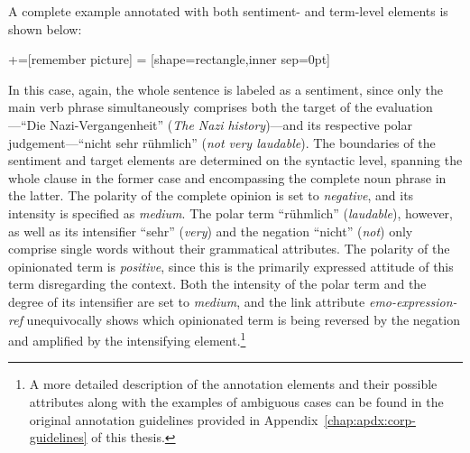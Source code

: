 A complete example annotated with both sentiment- and term-level
elements is shown below:
\begin{example}\label{snt:exmp:sent-anno2}
  +=[remember picture]
   = [shape=rectangle,inner sep=0pt]
  \upshape{}\\[2.2em]
  \noindent{}

\end{example}
In this case, again, the whole sentence is labeled as a sentiment,
since only the main verb phrase simultaneously comprises both the
target of the evaluation---``Die Nazi-Vergangenheit'' (\emph{The Nazi
  history})---and its respective polar judgement---``nicht sehr
r\"uhmlich'' (\emph{not very laudable}).  The boundaries of the
sentiment and target elements are determined on the syntactic level,
spanning the whole clause in the former case and encompassing the
complete noun phrase in the latter.  The polarity of the complete
opinion is set to \emph{negative}, and its intensity is specified as
\emph{medium}.  The polar term ``r\"uhmlich''
(\emph{laudable}), however, as well as its intensifier ``sehr''
(\emph{very}) and the negation ``nicht'' (\emph{not}) only comprise
single words without their grammatical attributes.  The polarity of
the opinionated term is \emph{positive}, since this is the primarily
expressed attitude of this term disregarding the context.  Both the
intensity of the polar term and the degree of its
intensifier are set to \emph{medium}, and the link attribute
\emph{emo-expression-ref} unequivocally shows which opinionated term
is being reversed by the negation and amplified by the intensifying
element.\footnote{A more detailed description of the annotation
  elements and their possible attributes along with the examples of
  ambiguous cases can be found in the original annotation guidelines
  provided in Appendix~\ref{chap:apdx:corp-guidelines} of this thesis.}

